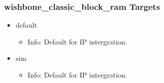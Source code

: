 \subsubsection{wishbone\_classic\_block\_ram Targets}
\begin{itemize}
\item default
	\begin{itemize}
	\item[$\space$] Info: Default for IP intergration.
	\end{itemize}
\item sim
	\begin{itemize}
	\item[$\space$] Info: Default for IP intergration.
	\end{itemize}
\end{itemize}
